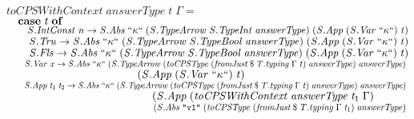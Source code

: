\documentclass[10pt]{article}
\newcommand{\Conid}[1]{\mathit{#1}}
\newcommand{\Varid}[1]{\mathit{#1}}
\begin{document}
\begin{hscode}
${\Varid{toCPSWithContext}\;\Varid{answerType}\;\Varid{t}\;\Gamma\mathrel{=}}$\\
${\hskip1.00em\relax\mathbf{case}\;\Varid{t}\;\mathbf{of}}$\\
${\hskip1.00em\relax\hskip1.00em\relax\Conid{\Conid{S}.IntConst}\;\Varid{n}\to \Conid{\Conid{S}.Abs}\;\text{``}\kappa\text{``}\;(\Conid{\Conid{S}.TypeArrow}\;\Conid{\Conid{S}.TypeInt}\;\Varid{answerType})\;(\Conid{\Conid{S}.App}\;(\Conid{\Conid{S}.Var}\;\text{``}\kappa\text{``})\;\Varid{t})}$\\
${\hskip1.00em\relax\hskip1.00em\relax\Conid{\Conid{S}.Tru}\to \Conid{\Conid{S}.Abs}\;\text{``}\kappa\text{``}\;(\Conid{\Conid{S}.TypeArrow}\;\Conid{\Conid{S}.TypeBool}\;\Varid{answerType})\;(\Conid{\Conid{S}.App}\;(\Conid{\Conid{S}.Var}\;\text{``}\kappa\text{``})\;\Varid{t})}$\\
${\hskip1.00em\relax\hskip1.00em\relax\Conid{\Conid{S}.Fls}\to \Conid{\Conid{S}.Abs}\;\text{``}\kappa\text{``}\;(\Conid{\Conid{S}.TypeArrow}\;\Conid{\Conid{S}.TypeBool}\;\Varid{answerType})\;(\Conid{\Conid{S}.App}\;(\Conid{\Conid{S}.Var}\;\text{``}\kappa\text{``})\;\Varid{t})}$\\
${\hskip1.00em\relax\hskip1.00em\relax\Conid{\Conid{S}.Var}\;\Varid{x}\to \Conid{\Conid{S}.Abs}\;\text{``}\kappa\text{``}\;(\Conid{\Conid{S}.TypeArrow}\;(\Varid{toCPSType}\;(\Varid{fromJust}\mathbin{\$}\Varid{\Conid{T}.typing}\;\Gamma\;\Varid{t})\;\Varid{answerType})\;\Varid{answerType})\;}$\\
${\hskip1.00em\relax\hskip1.00em\relax\phantom{\Conid{\Conid{S}.Var}\;\Varid{x}\to \Conid{\Conid{S}.Abs}\;\text{``}\kappa\text{``}\;\mbox{}}(\Conid{\Conid{S}.App}\;(\Conid{\Conid{S}.Var}\;\text{``}\kappa\text{``})\;\Varid{t})}$\\
${\hskip1.00em\relax\hskip1.00em\relax\Conid{\Conid{S}.App}\;\Varid{t}_{1}\;\Varid{t}_{2}\to \Conid{\Conid{S}.Abs}\;\text{``}\kappa\text{``}\;(\Conid{\Conid{S}.TypeArrow}\;(\Varid{toCPSType}\;(\Varid{fromJust}\mathbin{\$}\Varid{\Conid{T}.typing}\;\Gamma\;\Varid{t})\;\Varid{answerType})\;\Varid{answerType})\;}$\\
${\hskip1.00em\relax\hskip1.00em\relax\phantom{\Conid{\Conid{S}.App}\;\Varid{t}_{1}\;\Varid{t}_{2}\to \Conid{\Conid{S}.Abs}\;\text{``}\kappa\text{``}\;\mbox{}}(\Conid{\Conid{S}.App}\;(\Varid{toCPSWithContext}\;\Varid{answerType}\;\Varid{t}_{1}\;\Gamma)\;}$\\
${\hskip1.00em\relax\hskip1.00em\relax\phantom{\Conid{\Conid{S}.App}\;\Varid{t}_{1}\;\Varid{t}_{2}\to \Conid{\Conid{S}.Abs}\;\text{``}\kappa\text{``}\;\mbox{}}\phantom{(\Conid{\Conid{S}.App}\;\mbox{}}(\Conid{\Conid{S}.Abs}\;\text{\tt \char34 v1\char34}\;(\Varid{toCPSType}\;(\Varid{fromJust}\mathbin{\$}\Varid{\Conid{T}.typing}\;\Gamma\;\Varid{t}_{1})\;\Varid{answerType})\;}$\\

\end{hscode}
\end{document}
